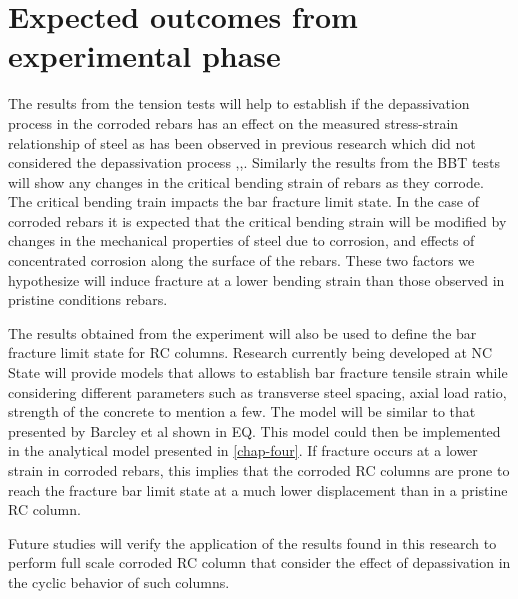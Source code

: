 \section{Expected outcomes from experimental phase}

The results from the tension tests will help to establish if the depassivation process in the corroded rebars has an effect on the measured stress-strain relationship of steel as has been observed in previous research which did not considered the depassivation process \cite{Meda2014},\cite{Yuan2017a},\cite{Du2005}. Similarly the results from the BBT tests will show any changes in the critical bending strain of rebars as they corrode. The critical bending train impacts the bar fracture limit state. In the case of corroded rebars it is expected that the critical bending strain will be modified by changes in the mechanical properties of steel due to corrosion, and effects of concentrated corrosion along the surface of the rebars. These two factors we hypothesize will induce fracture at a lower bending strain than those observed in pristine conditions rebars\cite{Barcley2019}.

The results obtained from the experiment will also be used to define the bar fracture limit state for RC columns. Research currently being developed at NC State will provide models that allows to establish bar fracture tensile strain while considering different parameters such as transverse steel spacing, axial load ratio, strength of the concrete to mention a few. The model will be similar to that presented by Barcley et al \cite{Barcley2018} shown in EQ. This model could then be implemented in the analytical model presented in \ref{chap-four}. If fracture occurs at a lower strain in corroded rebars, this implies that the corroded RC columns are prone to reach the fracture bar limit state at a much lower displacement than in a pristine RC column.

Future studies will verify the application of the results found in this research to perform full scale corroded RC column that consider the effect of depassivation in the cyclic behavior of such columns.